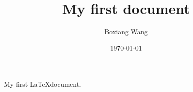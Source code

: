 \documentclass[12pt]{article}
\title{My first document}
\date{\today}
\author{Boxiang Wang}
\begin{document}
\maketitle
My first \LaTeX document.
\end{document}
